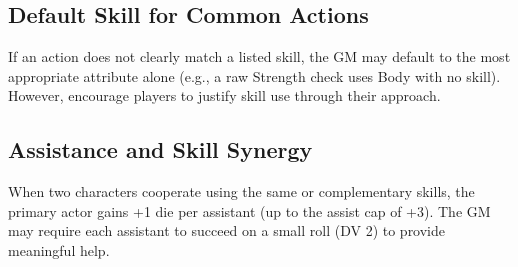 \subsection{Default Skill for Common Actions}

If an action does not clearly match a listed skill, the GM may default to the most appropriate attribute alone (e.g., a raw Strength check uses Body with no skill). However, encourage players to justify skill use through their approach.

\subsection{Assistance and Skill Synergy}

When two characters cooperate using the same or complementary skills, the primary actor gains +1 die per assistant (up to the assist cap of +3). The GM may require each assistant to succeed on a small roll (DV 2) to provide meaningful help.


